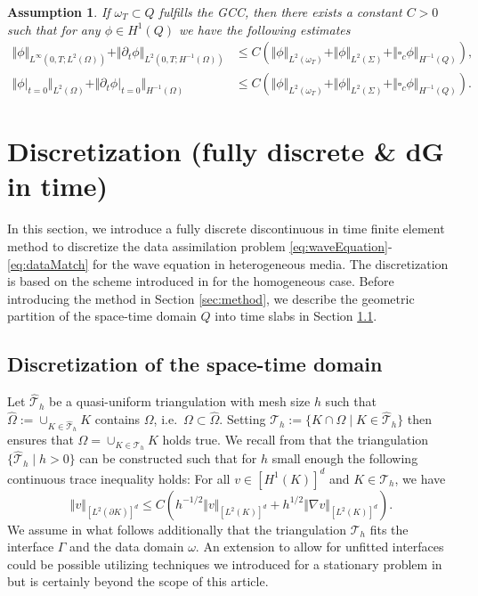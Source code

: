 \documentclass[sn-mathphys-num]{sn-jnl}
\newtheorem{assum}{Assumption}
\numberwithin{equation}{section}
\newcommand{\dt}{\partial_t}
\begin{document}
\begin{assum}\label{assum:LipschitzStability}
    If $\omega_T \subset Q$ fulfills the GCC, then there exists a constant $C > 0$ such that for any $\phi \in H^1(Q)$ we have the following estimates
    \begin{align*}
        \Vert \phi \Vert_{L^\infty(0,T;L^2(\Omega))} + \Vert \dt \phi \Vert_{L^2(0,T;H^{-1}(\Omega))} &\le C \left(  \Vert \phi \Vert_{L^2(\omega_T)} + \Vert \phi \Vert_{L^2(\Sigma)} + \Vert \square_c \phi \Vert_{H^{-1}(Q)} \right), \\
        \Vert \phi \vert_{t = 0} \Vert_{L^2(\Omega)} + \Vert \dt \phi \vert_{t = 0} \Vert_{H^{-1}(\Omega)} &\le C \left(\Vert \phi \Vert_{L^2(\omega_T)} + \Vert \phi \Vert_{L^2(\Sigma)} + \Vert \square_c \phi \Vert_{H^{-1}(Q)} \right). 
    \end{align*}
\end{assum}


\section{Discretization (fully discrete \& dG in time)} 
\noindent In this section, we introduce a fully discrete discontinuous in time finite element method to discretize the data assimilation problem \eqref{eq:waveEquation}-\eqref{eq:dataMatch} for the wave equation in heterogeneous media. The discretization is based on the scheme introduced in \cite{BP24} for the homogeneous case. Before introducing the method in Section \ref{sec:method}, we describe the geometric partition of the space-time domain $Q$ into time slabs in Section \ref{sec:spaceTimeDiscretization}. 

\subsection{Discretization of the space-time domain}\label{sec:spaceTimeDiscretization}
Let $\hat{\mathcal{T}}_h$ be a quasi-uniform triangulation with mesh size $h$ such that $\hat{\Omega}:= \cup_{K \in \hat{\mathcal{T}}_h} K $ contains $\Omega$, i.e.\ $\Omega \subset \hat{\Omega}$. Setting $\mathcal{T}_h := \{ K \cap \Omega \mid K \in  \hat{\mathcal{T}}_h \}$ then ensures that $\Omega = \cup_{K \in \mathcal{T}_h} K$ holds true.  
We recall from  \cite[Sec. 4.2]{BFMO21control} that the triangulation $\{ \hat{\mathcal{T}}_h \mid h > 0 \}$ can be constructed such that for $h$ small enough the following continuous trace inequality holds:  For all $v \in [H^1(K)]^d$ and $K \in \mathcal{T}_h$, we have
\begin{equation}\label{eq:traceInequality}
    \Vert v \Vert_{[L^2(\partial K)]^d} \le C \left(h^{-1/2} \Vert v \Vert_{[L^2(K)]^d} + h^{1/2} \Vert \nabla v \Vert_{[L^2(K)]^d} \right).  
\end{equation}
We assume in what follows additionally that the triangulation $\mathcal{T}_h$ fits the interface $\Gamma$ and the data domain $\omega$. An extension to allow for unfitted interfaces could be possible utilizing techniques we introduced for a stationary problem in \cite{BP23arxiv} but is certainly beyond the scope of this article. 
\end{document}
